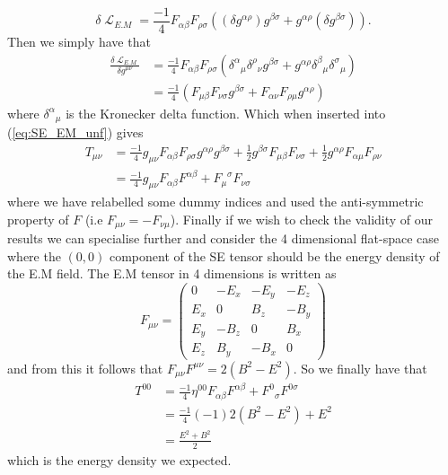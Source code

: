 \documentclass[12pt]{article}
\numberwithin{equation}{section}
\DeclareMathOperator{\Lagr}{\mathcal{L}}
\numberwithin{figure}{section}
\begin{document}
\begin{equation}
	\delta \Lagr_{E.M} = \frac{-1}{4}F_{\alpha\beta}F_{\rho\sigma}( (\delta g^{\alpha\rho}) g^{\beta\sigma} + g^{\alpha\rho} (\delta g^{\beta\sigma})).
\end{equation}
Then we simply have that
\begin{align}
	\frac{\delta\Lagr_{E.M}}{\delta g^{\mu\nu}} &= \frac{-1}{4}F_{\alpha\beta}F_{\rho\sigma}({\delta^\alpha}_\mu {\delta^\rho}_\nu g^{\beta\sigma} + g^{\alpha\rho} {\delta^\beta}_\mu {\delta^\sigma}_\mu)\\
	&=\frac{-1}{4} (F_{\mu\beta}F_{\nu\sigma}g^{\beta\sigma} + F_{\alpha\nu}F_{\rho\mu}g^{\alpha\rho})
\end{align}
where ${\delta^\alpha}_\mu$ is the Kronecker delta function. Which when inserted into (\ref{eq:SE_EM_unf}) gives
\begin{align}
	T_{\mu\nu}&=\frac{-1}{4}g_{\mu\nu}F_{\alpha\beta}F_{\rho\sigma}g^{\alpha\rho}g^{\beta\sigma} + \frac{1}{2} g^{\beta\sigma}F_{\mu\beta}F_{\nu\sigma} + \frac{1}{2} g^{\alpha\rho}F_{\alpha\mu}F_{\rho\nu}\\
	&=\frac{-1}{4}g_{\mu\nu}F_{\alpha\beta}F^{\alpha\beta}+  {F_\mu}^\sigma F_{\nu\sigma} \label{eq:SE_EM_fin}
\end{align}
where we have relabelled some dummy indices and used the anti-symmetric property of $F$ (i.e $F_{\mu\nu} = -F_{\nu\mu}$). Finally if we wish to check the validity of our results we can specialise further and consider the 4 dimensional flat-space case where the $(0,0)$ component of the SE tensor should be the energy density of the E.M field. The E.M tensor in 4 dimensions is written as
\begin{equation}
	F_{\mu\nu} = 
		\begin{pmatrix}
		0 & -E_x & -E_y & -E_z \\
		E_x & 0 & B_z & -B_y \\
		E_y & -B_z & 0 & B_x \\
		E_z & B_y & -B_x & 0 
	\end{pmatrix}
\end{equation}
and from this it follows that $F_{\mu\nu}F^{\mu\nu} = 2(B^2-E^2)$. So we finally have that
\begin{align}
	T^{00}&=\frac{-1}{4}\eta^{00}F_{\alpha\beta}F^{\alpha\beta}+  {F^0}_\sigma F^{0\sigma}\\
	&=\frac{-1}{4}(-1)2(B^2-E^2) + E^2\\
	&= \frac{E^2+B^2}{2}
\end{align}
which is the energy density we expected.
%
%
\end{document}
